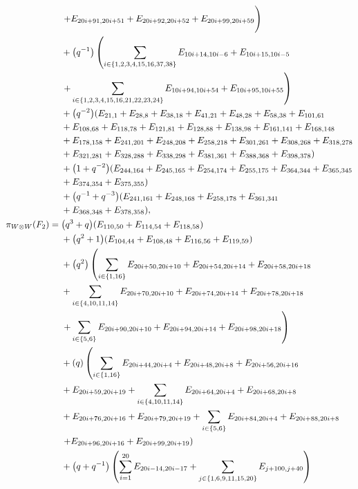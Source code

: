\documentclass[pdftex]{sigma}
\numberwithin{equation}{section}
\theoremstyle{definition}
\begin{document}
\begin{align*}
&\left. + E_{20i+91,20i+51}+ E_{20i+92,20i+52} + E_{20i+99,20i+59} \vphantom{\sum_{i=1}^{20}}\right) \\
&+\bigl(q^{-1}\bigr)\left(\sum_{i \in \{1,2,3,4,15,16,37,38\}} E_{10i+14,10i-6} + E_{10i+15,10i-5} \right. \\
&\left. + \sum_{i \in \{1,2,3,4,15,16,21,22,23,24\}} E_{10i+94,10i+54} + E_{10i+95,10i+55} \right) \\
&
+\bigl(q^{-2}\bigr)(E_{21,1}+E_{28,8}+E_{38,18}+E_{41,21}+E_{48,28}+E_{58,38}+E_{101,61}\\
&+E_{108,68}+E_{118,78}+E_{121,81}+E_{128,88}+E_{138,98}+E_{161,141}+E_{168,148}\\
&+E_{178,158}+E_{241,201}+E_{248,208}+E_{258,218}+E_{301,261}+E_{308,268}+E_{318,278}\\
&+E_{321,281}+E_{328,288}+E_{338,298}+E_{381,361}+E_{388,368}+E_{398,378})\\
&+\bigl(1 + q^{-2}\bigr)(E_{244,164}+E_{245,165}+E_{254,174}+E_{255,175}+E_{364,344}+E_{365,345}\\
&+E_{374,354}+E_{375,355})\\
&+\bigl(q^{-1} + q^{-3}\bigr)(E_{241,161}+E_{248,168}+E_{258,178}+E_{361,341}\\
&+E_{368,348}+E_{378,358}),
\\
 \pi_{W \otimes W}(F_2) ={}
&\bigl(q^3 + q\bigr)(E_{110,50}+E_{114,54}+E_{118,58})\\
&+\bigl(q^2 + 1\bigr)(E_{104,44}+E_{108,48}+E_{116,56}+E_{119,59})\\
&+\bigl(q^2\bigr)\left(\sum_{i \in \{1,16\}} E_{20i+50,20i+10} + E_{20i+54,20i+14} + E_{20i+58,20i+18} \right.\\
&+\sum_{i \in \{4,10,11,14\}} E_{20i+70,20i+10} + E_{20i+74,20i+14} + E_{20i+78,20i+18} \\
&\left.+\sum_{i \in \{5,6\}} E_{20i+90,20i+10} + E_{20i+94,20i+14} + E_{20i+98,20i+18} \right) \\
&+(q)\left(\sum_{i \in \{1,16\}} E_{20i+44,20i+4} + E_{20i+48,20i+8} + E_{20i+56,20i+16} \right.\\
&+ E_{20i+59,20i+19}+\sum_{i \in \{4,10,11,14\}} E_{20i+64,20i+4} + E_{20i+68,20i+8} \\
&+ E_{20i+76,20i+16} + E_{20i+79,20i+19}+ \sum_{i \in \{5,6\}} E_{20i+84,20i+4} + E_{20i+88,20i+8} \\
&\left. + E_{20i+96,20i+16}+ E_{20i+99,20i+19} \right)
\\
&
+\bigl(q+q^{-1}\bigr) \left( \sum_{i=1}^{20} E_{20i-14,20i-17} \vphantom{\sum_{j \in \{1,6,9,11,15,20\}}} + \sum_{j \in \{1,6,9,11,15,20\}} E_{j+100,j+40} \right)\\

\end{align*}
\end{document}
